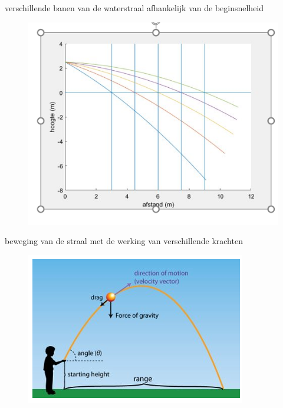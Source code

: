 \documentclass{kulakarticle}
\begin{document}
	verschillende banen van de waterstraal afhankelijk van de beginsnelheid
	
	\begin{figure}
	\centering
	\includegraphics[width=.62\textwidth]{waterbaan}
	\end{figure}
	
	
	beweging van de straal met de werking van verschillende krachten
	\begin{figure}
	\centering
	\includegraphics[width=.62\textwidth]{baanbeweging}
	\end{figure}
\end{document}
